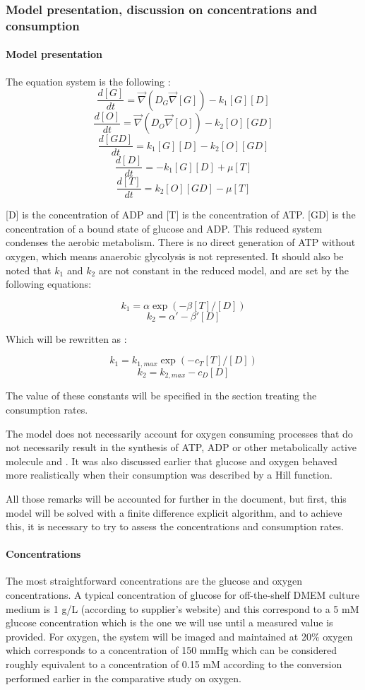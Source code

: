 \documentclass[11pt,a4paper]{article}
\begin{document}
\subsubsection{Model presentation, discussion on concentrations and consumption}
\paragraph{Model presentation}
The equation system is the following :
\[ \frac{d [G]}{d t} = \overrightarrow{\nabla} (D_G \overrightarrow{\nabla} [G]) - k_1 [G][D]  \]
\[ \frac{d [O]}{d t} = \overrightarrow{\nabla} (D_O \overrightarrow{\nabla} [O]) - k_2 [O][GD]  \]
\[ \frac{d [GD]}{d t} =  k_1 [G][D] - k_2 [O][GD] \]
\[ \frac{d [D]}{d t} =  -k_1 [G][D] + \mu [T]  \]
\[ \frac{d [T]}{d t} =  k_2 [O][GD] - \mu [T]  \]

[D] is the concentration of ADP and [T] is the concentration of ATP. [GD] is the concentration of a bound state of glucose and ADP. This reduced system condenses the aerobic metabolism. There is no direct generation of ATP without oxygen, which means anaerobic glycolysis is not represented. It should also be noted that $k_1$ and $k_2$ are not constant in the reduced model, and are set by the following equations: 

\[k_1 = \alpha \exp(-\beta[T]/[D])\]
\[k_2 = \alpha' - \beta'[D]\]

Which will be rewritten as :

\[k_1 = k_{1,max} \exp(-c_T [T]/[D])\]
\[k_2 = k_{2,max} - c_D[D]\]

The value of these constants will be specified in the section treating the consumption rates.

The model does not necessarily account for oxygen consuming processes that do not necessarily result in the synthesis of ATP, ADP or other metabolically active molecule and . It was also discussed earlier that glucose and oxygen behaved more realistically when their consumption was described by a Hill function. 

All those remarks will be accounted for further in the document, but first, this model will be solved with a finite difference explicit algorithm, and to achieve this, it is necessary to try to assess the concentrations and consumption rates.

\paragraph{Concentrations}
The most straightforward concentrations are the glucose and oxygen concentrations. A typical concentration of glucose for off-the-shelf DMEM culture medium is 1 g/L (according to supplier's website) and this correspond to a 5 mM glucose concentration which is the one we will use until a measured value is provided. For oxygen, the system will be imaged and maintained at 20\% oxygen which corresponds to a concentration of 150 mmHg which can be considered roughly equivalent to a concentration of 0.15 mM according to the conversion performed earlier in the comparative study on oxygen. 
\end{document}
